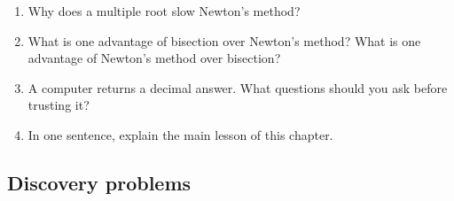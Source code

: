 \begin{enumerate}
\item Why does a multiple root slow Newton's method?

\item What is one advantage of bisection over Newton's method?  What is one advantage of
Newton's method over bisection?

\item A computer returns a decimal answer.  What questions should you ask before trusting
it?

\item In one sentence, explain the main lesson of this chapter.
\end{enumerate}

\subsection{Discovery problems}
\label{subsec:chapter-12-discovery-problems}

